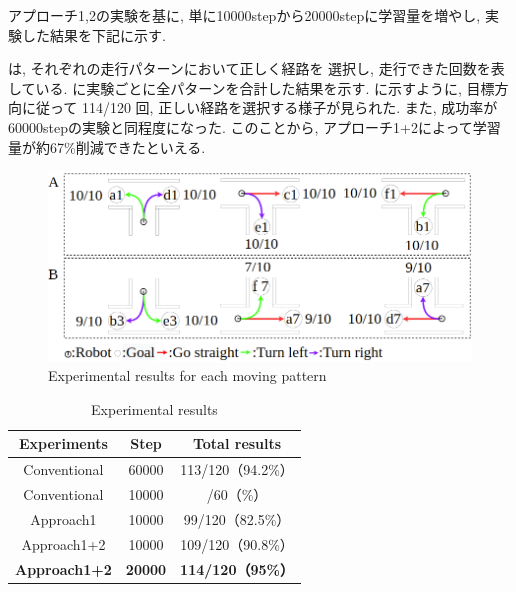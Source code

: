 アプローチ1,2の実験を基に, 単に10000stepから20000stepに学習量を増やし, 実験した結果を下記に示す.

は, それぞれの走行パターンにおいて正しく経路を
選択し, 走行できた回数を表している.  に実験ごとに全パターンを合計した結果を示す.  に示すように, 目標方向に従って 114/120 回, 正しい経路を選択する様子が見られた. また, 成功率が60000stepの実験と同程度になった. このことから, アプローチ1+2によって学習量が約67\%削減できたといえる. 

\begin{figure}[hbtp]
  \centering
 \includegraphics[keepaspectratio, scale=0.42]
      {images/20000step_act1.5.png}
 \caption{Experimental results for each moving pattern}
 \label{Fig:20000step_act1.5}
\end{figure} 

\begin{table}[hbtp]
  \caption{Experimental results}
  \label{table:result5}
  \centering
  \begin{tabular}{|c|c|c|}
    \hline
    Experiments & Step & Total results\\
    \hline
    Conventional & 60000 & 113/120（94.2\%）\\
    \hline
    Conventional & 10000 & /60（\%）\\
    \hline
    Approach1 & 10000 & 99/120（82.5\%）\\
    \hline
    Approach1+2 & 10000 & 109/120（90.8\%）\\
    \hline
    \textbf{Approach1+2} & \textbf{20000} & \textbf{114/120（95\%）}\\
    \hline
  \end{tabular}
\end{table}


\newpage


